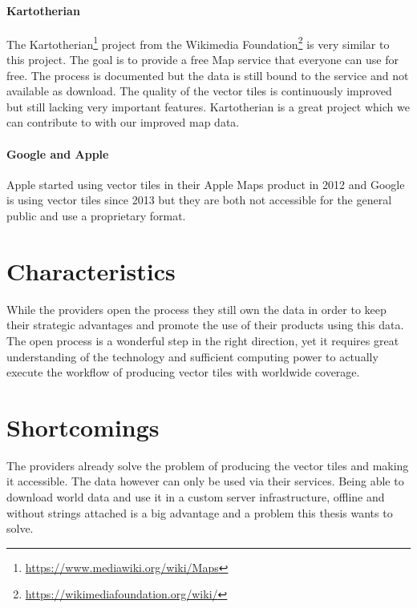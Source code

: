 \paragraph{Kartotherian}

The Kartotherian\footnote{\url{https://www.mediawiki.org/wiki/Maps}} project from the Wikimedia Foundation\footnote{\url{https://wikimediafoundation.org/wiki/}} is very similar to this project.
The goal is to provide a free Map service that everyone can use for free.
The process is documented but the data is still bound to the service and not available as download.
The quality of the vector tiles is continuously improved but still lacking very important features.
Kartotherian is a great project which we can contribute to with our improved map data.

\paragraph{Google and Apple}

Apple started using vector tiles in their Apple Maps product in 2012\cite{wiki:apple-maps}  and  Google is using vector tiles since 2013\cite{wiki:google-maps} but they are both not accessible for the general public and use a proprietary format. 

\section{Characteristics}

While the providers open the process they still own the data in order to keep their strategic advantages and promote the use of their products using this data.
The open process is a wonderful step in the right direction, yet it requires great understanding
of the technology and sufficient computing power to actually
execute the workflow of producing vector tiles with worldwide coverage.

\section{Shortcomings}

The providers already solve the problem of producing the vector tiles
and making it accessible. The data however can only be used
via their services.
\newline{}
Being able to download world data and use it in a custom server
infrastructure, offline and without strings attached is a big advantage
and a problem this thesis wants to solve.

\newpage